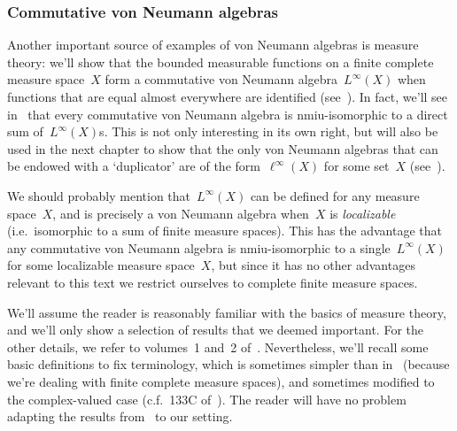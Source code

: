 \documentclass[a]{subfiles}
\begin{document}
\subsubsection{Commutative von Neumann algebras}
\begin{parsec}%
\begin{point}%
Another important source of examples of von 
Neumann algebras is measure theory:
we'll show that the bounded measurable
functions on a 
finite complete
measure space~$X$
form a commutative von Neumann algebra~$L^\infty(X)$
when functions that are equal almost everywhere are identified
(see~).
In fact, 
we'll see in~
that
every commutative von Neumann algebra is nmiu-isomorphic
to a direct sum of~$L^\infty(X)$s.
This is not only interesting in its own right,
but will also
be used in the next chapter
to show that the only von Neumann algebras
that can be endowed with a `duplicator'
are of the form~$\ell^\infty(X)$
for some set~$X$ (see~).

We should probably mention that~$L^\infty(X)$
can be defined for any measure space~$X$,
and is precisely a von Neumann algebra
when~$X$ is \emph{localizable} (i.e.~isomorphic
to a sum of finite measure spaces).
This has the advantage that any commutative von Neumann algebra
is nmiu-isomorphic
to a single~$L^\infty(X)$
for some localizable measure space~$X$,
but since it has no other advantages relevant
to this text
we restrict ourselves to complete finite measure spaces.

We'll assume the reader is reasonably familiar with 
the basics of measure theory,
and we'll only show a selection of results
that we deemed important.
For the other details,
we refer to volumes~1 and~2 of~\cite{fremlin}.
Nevertheless,
we'll  recall
some basic definitions
to fix terminology,
which is sometimes simpler than in~\cite{fremlin}
(because we're dealing with finite complete measure spaces),
and sometimes modified to the complex-valued case
(c.f.~133C of~\cite{fremlin}).
The reader will have no problem adapting
the results from~\cite{fremlin} 
to our setting.
\end{point}
\end{parsec}%
\end{document}

